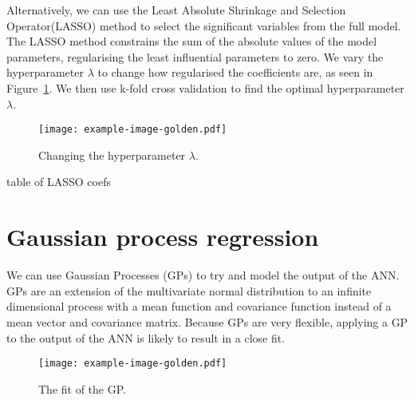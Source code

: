 Alternatively, we can use the Least Absolute Shrinkage and Selection Operator(LASSO) method to select the significant variables from the full model.
The LASSO method constrains the sum of the absolute values of the model parameters, regularising the least influential parameters to zero.
We vary the hyperparameter \(\lambda\) to change how regularised the coefficients are, as seen in Figure~\ref{fig:lasso-lambda}.
We then use k-fold cross validation to find the optimal hyperparameter \(\lambda\).

\begin{figure}[htbp]
	\centering
	\texttt{[image: example-image-golden.pdf]}
	\caption{Changing the hyperparameter \(\lambda\).}
	\label{fig:lasso-lambda}
\end{figure}

\begin{todo}table of LASSO coefs\end{todo}

\section{Gaussian process regression}

We can use Gaussian Processes (GPs) to try and model the output of the ANN.
GPs are an extension of the multivariate normal distribution to an infinite dimensional process with a mean function and covariance function instead of a mean vector and covariance matrix.
Because GPs are very flexible, applying a GP to the output of the ANN is likely to result in a close fit.

\begin{figure}[htbp]
	\centering
	\texttt{[image: example-image-golden.pdf]}
	\caption{The fit of the GP.}
	\label{fig:gp-fit}
\end{figure}
